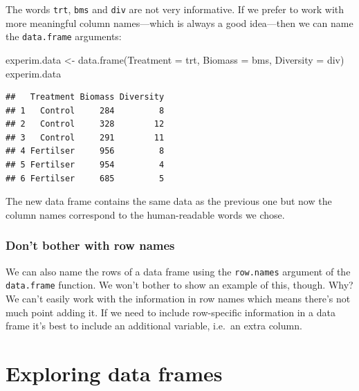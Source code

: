 \documentclass[
]{book}
\newenvironment{Shaded}{\begin{snugshade}}{\end{snugshade}}
\newcommand{\AttributeTok}[1]{\textcolor[rgb]{0.77,0.63,0.00}{#1}}
\newcommand{\FunctionTok}[1]{\textcolor[rgb]{0.00,0.00,0.00}{#1}}
\newcommand{\NormalTok}[1]{#1}
\newcommand{\OtherTok}[1]{\textcolor[rgb]{0.56,0.35,0.01}{#1}}
\newenvironment{greybox}{
  \definecolor{shadecolor}{rgb}{0.95,0.95,0.95}  %
  \color{black}
  \begin{shaded}}
 {\end{shaded}}
\newenvironment{infobox}[1]
  {
  \begin{itemize}
  \renewcommand{\labelitemi}{
    \raisebox{-.7\height}[0pt][0pt]{
      {\setkeys{Gin}{width=3em,keepaspectratio}
        \texttt{[image: images/\#1]}}
    }
  }
  \setlength{\fboxsep}{1em}
  \begin{greybox}
  \item
  }
  {
  \end{greybox}
  \end{itemize}
  }
\begin{document}
The words \texttt{trt}, \texttt{bms} and \texttt{div} are not very informative. If we prefer to work with more meaningful column names---which is always a good idea---then we can name the \texttt{data.frame} arguments:

\begin{Shaded}
\begin{Highlighting}[]
\NormalTok{experim.data }\OtherTok{\textless{}{-}} \FunctionTok{data.frame}\NormalTok{(}\AttributeTok{Treatment =}\NormalTok{ trt, }\AttributeTok{Biomass =}\NormalTok{ bms, }\AttributeTok{Diversity =}\NormalTok{ div)}
\NormalTok{experim.data}
\end{Highlighting}
\end{Shaded}

\begin{verbatim}
##   Treatment Biomass Diversity
## 1   Control     284         8
## 2   Control     328        12
## 3   Control     291        11
## 4 Fertilser     956         8
## 5 Fertilser     954         4
## 6 Fertilser     685         5
\end{verbatim}

The new data frame contains the same data as the previous one but now the column names correspond to the human-readable words we chose.

\begin{infobox}{warning}

\hypertarget{dont-bother-with-row-names}{%
\subsubsection*{Don't bother with row names}\label{dont-bother-with-row-names}}

We can also name the rows of a data frame using the \texttt{row.names} argument of the \texttt{data.frame} function. We won't bother to show an example of this, though. Why? We can't easily work with the information in row names which means there's not much point adding it. If we need to include row-specific information in a data frame it's best to include an additional variable, i.e.~an extra column.

\end{infobox}

\hypertarget{exploring-data-frames}{%
\section{Exploring data frames}\label{exploring-data-frames}}
\end{document}
